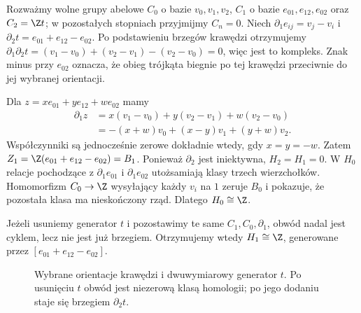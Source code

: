 \begin{przyklad}
\label{prz:homologia-alg-trojkat}
Rozważmy wolne grupy abelowe $C_0$ o bazie
$v_0,v_1,v_2$, $C_1$ o bazie $e_{01},e_{12},e_{02}$
oraz $C_2=\Z t$; w pozostałych stopniach
przyjmijmy $C_n=0$. Niech
$\partial_1e_{ij}=v_j-v_i$ i
$\partial_2t=e_{01}+e_{12}-e_{02}$.
Po podstawieniu brzegów krawędzi otrzymujemy
$\partial_1\partial_2t=(v_1-v_0)+(v_2-v_1)-(v_2-v_0)=0$,
więc jest to kompleks.
Znak minus przy $e_{02}$ oznacza, że obieg
trójkąta biegnie po tej krawędzi przeciwnie
do jej wybranej orientacji.

Dla $z=x e_{01}+y e_{12}+w e_{02}$ mamy
\[
 \begin{aligned}
 \partial_1 z
 &=x(v_1-v_0)+y(v_2-v_1)+w(v_2-v_0)\\
 &=-(x+w)v_0+(x-y)v_1+(y+w)v_2.
 \end{aligned}
\]
Współczynniki są jednocześnie zerowe dokładnie
wtedy, gdy $x=y=-w$. Zatem
$Z_1=\Z(e_{01}+e_{12}-e_{02})=B_1$.
Ponieważ $\partial_2$ jest iniektywna,
$H_2=H_1=0$. W $H_0$ relacje pochodzące
z $\partial_1 e_{01}$ i $\partial_1 e_{02}$
utożsamiają klasy trzech wierzchołków.
Homomorfizm $C_0\to\Z$ wysyłający każdy
$v_i$ na $1$ zeruje $B_0$ i pokazuje, że
pozostała klasa ma nieskończony rząd.
Dlatego $H_0\cong\Z$.

Jeżeli usuniemy generator $t$ i pozostawimy
te same $C_1,C_0,\partial_1$, obwód nadal
jest cyklem, lecz nie jest już brzegiem.
Otrzymujemy wtedy $H_1\cong\Z$, generowane
przez $[e_{01}+e_{12}-e_{02}]$.
\end{przyklad}

\begin{figure}[!htbp]
\centering
{}
\caption{Wybrane orientacje krawędzi i dwuwymiarowy generator $t$.
Po usunięciu $t$ obwód jest niezerową klasą homologii;
po jego dodaniu staje się brzegiem $\partial_2t$.}
\label{fig:homologia-alg-trojkat}
\end{figure}

